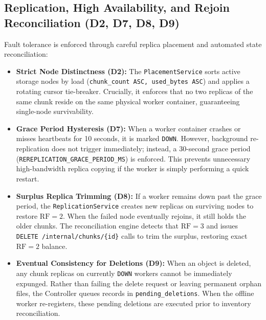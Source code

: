 \documentclass[12pt,a4paper]{report}
\begin{document}
\subsection{Replication, High Availability, and Rejoin Reconciliation (D2, D7, D8, D9)}
Fault tolerance is enforced through careful replica placement and automated state reconciliation:
\begin{itemize}[leftmargin=*]
  \item \textbf{Strict Node Distinctness (D2):} The \texttt{PlacementService} sorts active storage nodes by load (\texttt{chunk\_count ASC, used\_bytes ASC}) and applies a rotating cursor tie-breaker. Crucially, it enforces that no two replicas of the same chunk reside on the same physical worker container, guaranteeing single-node survivability.
  \item \textbf{Grace Period Hysteresis (D7):} When a worker container crashes or misses heartbeats for 10 seconds, it is marked \texttt{DOWN}. However, background re-replication does not trigger immediately; instead, a 30-second grace period (\texttt{REREPLICATION\_GRACE\_PERIOD\_MS}) is enforced. This prevents unnecessary high-bandwidth replica copying if the worker is simply performing a quick restart.
  \item \textbf{Surplus Replica Trimming (D8):} If a worker remains down past the grace period, the \texttt{ReplicationService} creates new replicas on surviving nodes to restore $\text{RF} = 2$. When the failed node eventually rejoins, it still holds the older chunks. The reconciliation engine detects that $\text{RF} = 3$ and issues \texttt{DELETE /internal/chunks/\{id\}} calls to trim the surplus, restoring exact $\text{RF} = 2$ balance.
  \item \textbf{Eventual Consistency for Deletions (D9):} When an object is deleted, any chunk replicas on currently \texttt{DOWN} workers cannot be immediately expunged. Rather than failing the delete request or leaving permanent orphan files, the Controller queues records in \texttt{pending\_deletions}. When the offline worker re-registers, these pending deletions are executed prior to inventory reconciliation.
\end{itemize}
\end{document}
